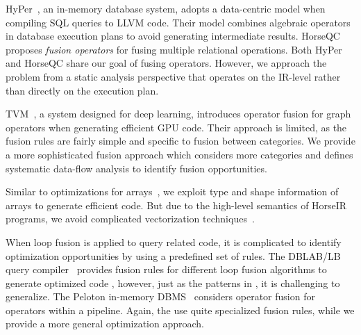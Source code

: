 HyPer~\cite{Neumann2011:HyPer}, an in-memory database system, adopts a data-centric
model when compiling SQL queries to LLVM code. Their model combines algebraic
operators in database execution plans to avoid generating intermediate results.
HorseQC~\cite{FunkeBNMT18:HorseQC} proposes \textit{fusion operators} for
fusing multiple relational operations. Both HyPer and HorseQC share our goal
of fusing operators. However, we approach the problem from a static analysis
perspective that operates on the IR-level rather than directly on the execution plan.

TVM~\cite{Chen18:TVM}, a system designed for deep learning, introduces
operator fusion for graph operators when generating efficient GPU code.
Their approach is limited, as the fusion rules are fairly simple and
specific to fusion between categories.  We provide a more sophisticated
fusion approach which considers more categories and defines systematic
data-flow analysis to identify fusion opportunities.

Similar to optimizations for arrays~\cite{KumarH14,FoleyH16matjuice},
we exploit type and shape information of arrays to generate efficient code.
But due to the high-level semantics of HorseIR programs, we avoid
complicated vectorization techniques~\cite{menon1999case,ChenKLH16}.

When loop fusion is applied to query related code, it is complicated to
identify optimization opportunities by using a predefined set of rules.
The DBLAB/LB query compiler~\cite{ShaikhhaKPBD016} 
provides fusion rules for different loop fusion algorithms to generate optimized code
\cite{Shaikhha2018:LoopFusion}, however, just as the patterns in \OldPaper, it is
challenging to generalize. %
The Peloton in-memory DBMS~\cite{Menon2017:Peloton} considers operator
fusion for operators within a pipeline. Again, the use quite specialized fusion
rules, while we provide a more general optimization approach. 



